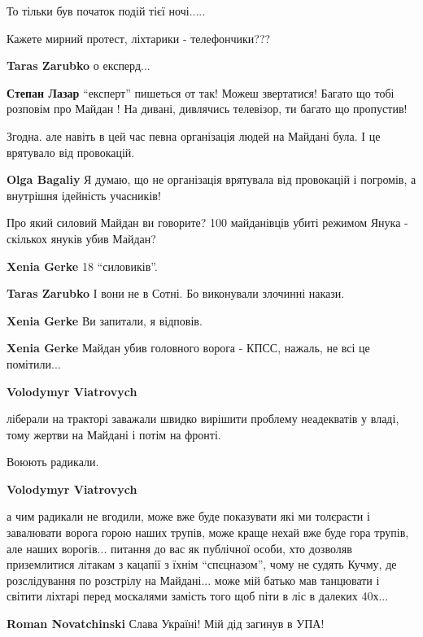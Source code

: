 \begin{itemize}
\begin{itemize}
\begin{itemize}
То тільки був початок подій тієї ночі.....

Кажете мирний протест, ліхтарики - телефончики???

\textbf{Taras Zarubko} о експерд...

\textbf{Степан Лазар} \enquote{експерт} пишеться от так!
Можеш звертатися! Багато що тобі розповім про Майдан ! На дивані, дивлячись
телевізор, ти багато що пропустив!
\end{itemize} %

Згодна. але навіть в цей час певна організація людей на Майдані була. І це врятувало від провокацій.

\textbf{Olga Bagaliy} Я думаю, що не організація врятувала від провокацій і погромів, а внутрішня ідейність учасників!

Про який силовий Майдан ви говорите? 100 майданівців убиті режимом Янука - скількох януків убив Майдан?

\begin{itemize} %
\textbf{Xenia Gerke} 18 \enquote{силовиків}.

\textbf{Taras Zarubko} І вони не в Сотні. Бо виконували злочинні накази.

\textbf{Xenia Gerke} Ви запитали, я відповів.

\textbf{Xenia Gerke} Майдан убив головного ворога - КПСС, нажаль, не всі це помітили...
\end{itemize} %

\textbf{Volodymyr Viatrovych} 

ліберали на тракторі заважали швидко вирішити проблему неадекватів у владі,
тому жертви на Майдані і потім на фронті.

Воюють радикали.

\textbf{Volodymyr Viatrovych} 

а чим радикали не вгодили, може вже буде показувати які ми толєрасти і
завалювати ворога горою наших трупів, може краще нехай вже буде гора трупів, але
наших ворогів... питання до вас як публічної особи, хто дозволяв приземлитися
літакам з кацапії з їхнім \enquote{спєцназом}, чому не судять Кучму, де розслідування по
розстрілу на Майдані... може мій батько мав танцювати і світити ліхтарі перед
москалями замість того щоб піти в ліс в далеких 40х...

\begin{itemize} %
\textbf{Roman Novatchinski} Слава Україні!
Мій дід загинув в УПА!


\end{itemize}
\end{itemize}
\end{itemize}
